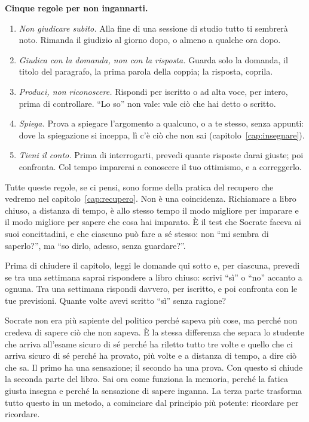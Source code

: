 \begin{inpratica}
\textbf{Cinque regole per non ingannarti.}
\begin{enumerate}
  \item \emph{Non giudicare subito.} Alla fine di una sessione di
        studio tutto ti sembrerà noto. Rimanda il giudizio al giorno
        dopo, o almeno a qualche ora dopo.
  \item \emph{Giudica con la domanda, non con la risposta.} Guarda
        solo la domanda, il titolo del paragrafo, la prima parola della
        coppia; la risposta, coprila.
  \item \emph{Produci, non riconoscere.} Rispondi per iscritto o ad
        alta voce, per intero, prima di controllare. \enquote{Lo so}
        non vale: vale ciò che hai detto o scritto.
  \item \emph{Spiega.} Prova a spiegare l'argomento a qualcuno, o a
        te stesso, senza appunti: dove la spiegazione si inceppa, lì
        c'è ciò che non sai (capitolo~\ref{cap:insegnare}).
  \item \emph{Tieni il conto.} Prima di interrogarti, prevedi quante
        risposte darai giuste; poi confronta. Col tempo imparerai a
        conoscere il tuo ottimismo, e a correggerlo.
\end{enumerate}
\end{inpratica}

Tutte queste regole, se ci pensi, sono forme della pratica del recupero
che vedremo nel capitolo~\ref{cap:recupero}. Non è una coincidenza.
Richiamare a libro chiuso, a distanza di tempo, è allo stesso tempo il
modo migliore per imparare e il modo migliore per sapere che cosa hai
imparato. È il test che Socrate faceva ai suoi concittadini, e che
ciascuno può fare a sé stesso: non \enquote{mi sembra di saperlo?}, ma
\enquote{so dirlo, adesso, senza guardare?}.

\begin{esercizio}
Prima di chiudere il capitolo, leggi le domande qui sotto e, per
ciascuna, prevedi se tra una settimana saprai rispondere a libro
chiuso: scrivi \enquote{sì} o \enquote{no} accanto a ognuna. Tra una
settimana rispondi davvero, per iscritto, e poi confronta con le tue
previsioni. Quante volte avevi scritto \enquote{sì} senza ragione?
\end{esercizio}

\asterismo

Socrate non era più sapiente del politico perché sapeva più cose, ma
perché non credeva di sapere ciò che non sapeva. È la stessa
differenza che separa lo studente che arriva all'esame sicuro di sé
perché ha riletto tutto tre volte e quello che ci arriva sicuro di sé
perché ha provato, più volte e a distanza di tempo, a dire ciò che sa.
Il primo ha una sensazione; il secondo ha una prova. Con questo si
chiude la seconda parte del libro. Sai ora come funziona la memoria,
perché la fatica giusta insegna e perché la sensazione di sapere
inganna. La terza parte trasforma tutto questo in un metodo, a
cominciare dal principio più potente: ricordare per ricordare.

